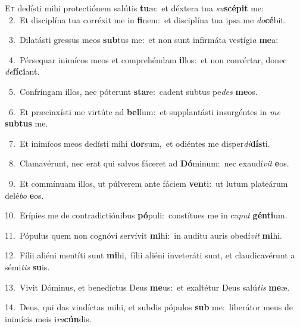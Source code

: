\lettrine{\initial\textcolor{\initialcolor}{E}}{t} dedísti mihi protectiónem salútis \textbf{tu}\-æ:~\star et déxtera tua \textit{su}\-\textbf{scé}\textbf{pit} me:\\
{\numbfont\textcolor{\numbcolor}{~2.}}~Et disciplína tua corréxit me in \textbf{fi}\-nem:~\star et disciplína tua ipsa me \textit{do}\-\textbf{cé}bit.\par
{\numbfont\textcolor{\numbcolor}{~3.}}~Dilatásti gressus meos \textbf{sub}\-tus me:~\star et non sunt infirmáta vestígi\textit{a} \textbf{me}\-a:\par
{\numbfont\textcolor{\numbcolor}{~4.}}~Pérsequar inimícos meos et comprehéndam \textbf{il}\-los:~\star et non convértar, donec \textit{de}\-\textbf{fí}\textbf{ci}ant.\par
{\numbfont\textcolor{\numbcolor}{~5.}}~Confríngam illos, nec póterunt \textbf{sta}\-re:~\star cadent subtus pe\textit{des} \textbf{me}\-os.\par
{\numbfont\textcolor{\numbcolor}{~6.}}~Et præcinxísti me virtúte ad \textbf{bel}\-lum:~\star et supplantásti insurgéntes in \textit{me} \textbf{sub}\-\textbf{tus} me.\par
{\numbfont\textcolor{\numbcolor}{~7.}}~Et inimícos meos dedísti mihi \textbf{dor}\-sum,~\star et odiéntes me disper\-\textit{di}\-\textbf{dís}ti.\par
{\numbfont\textcolor{\numbcolor}{~8.}}~Clamavérunt, nec erat qui salvos fáceret ad \textbf{Dó}\-minum:~\star nec exaudí\textit{vit} \textbf{e}\-os.\par
{\numbfont\textcolor{\numbcolor}{~9.}}~Et commínuam illos, ut púlverem ante fáciem \textbf{ven}\-ti:~\star ut lutum plateárum delé\textit{bo} \textbf{e}\-os.\par
{\numbfont\textcolor{\numbcolor}{10.}}~Erípies me de contradictiónibus \textbf{pó}\-puli:~\star constítues me in ca\textit{put} \textbf{gén}\-\textbf{ti}um.\par
{\numbfont\textcolor{\numbcolor}{11.}}~Pópulus quem non cognóvi servívit \textbf{mi}\-hi:~\star in audítu auris obedí\textit{vit} \textbf{mi}\-hi.\par
{\numbfont\textcolor{\numbcolor}{12.}}~Fílii aliéni mentíti sunt \textbf{mi}\-hi,~\star fílii aliéni inveteráti sunt, et claudicavérunt a sémi\textit{tis} \textbf{su}\-is.\par
{\numbfont\textcolor{\numbcolor}{13.}}~Vivit Dóminus, et benedíctus Deus \textbf{me}\-us:~\star et exaltétur Deus salú\textit{tis} \textbf{me}\-æ.\par
{\numbfont\textcolor{\numbcolor}{14.}}~Deus, qui das vindíctas mihi, et subdis pópulos \textbf{sub} me:~\star liberátor meus de inimícis meis i\-\textit{ra}\-\textbf{cún}dis.\par

